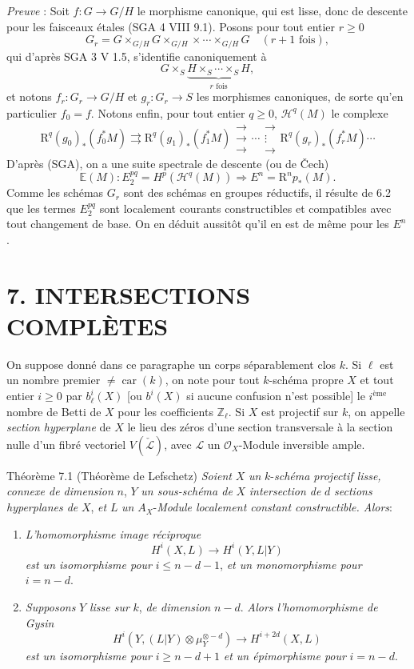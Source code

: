 \emph{Preuve} : Soit $f:G\to G/H$ le morphisme canonique, qui est lisse, donc de descente pour les faisceaux étales (SGA 4 VIII 9.1). Posons pour tout entier $r\ge0$
\[
G_r=G\times_{G/H}G\times_{G/H}\times\cdots\times_{G/H}G
\quad(r+1\text{ fois}),
\]
qui d'après SGA 3 V 1.5, s'identifie canoniquement à
\[
G\times_S\underbrace{H\times_S\cdots\times_S H}_{r\text{ fois}},
\]
et notons $f_r:G_r\to G/H$ et $g_r:G_r\to S$ les morphismes canoniques, de sorte qu'en particulier $f_0=f$. Notons enfin, pour tout entier $q\ge0$, $\mathcal{H}^q(M)$ le complexe
\[
\mathrm{R}^q(g_0)_*(f_0^*M)\rightrightarrows \mathrm{R}^q(g_1)_*(f_1^*M)\mathrel{\substack{\to\\\to\\\to}}\cdots\mathrel{\substack{\to\\\vdots\\\to}} \mathrm{R}^q(g_r)_*(f_r^*M)\cdots
\]
D'après (SGA), on a une suite spectrale de descente (ou de Čech)
\[
\mathbb{E}(M):E_2^{pq}=H^p(\mathcal{H}^q(M))\Rightarrow E^n=\mathrm{R}^np_*(M).
\]
Comme les schémas $G_r$ sont des schémas en groupes réductifs, il résulte de 6.2 que les termes $E_2^{pq}$ sont localement courants constructibles et compatibles avec tout changement de base. On en déduit aussitôt qu'il en est de même pour les $E^n$.

\section*{7. INTERSECTIONS COMPLÈTES}

On suppose donné dans ce paragraphe un corps séparablement clos $k$. Si $\ell$ est un nombre premier $\ne\operatorname{car}(k)$, on note pour tout $k$-schéma propre $X$ et tout entier $i\ge0$ par
$b_\ell^i(X)$ [ou $b^i(X)$ si aucune confusion n'est possible] le $i^{\text{ème}}$ nombre de Betti de $X$ pour les coefficients $\mathbb{Z}_\ell$. Si $X$ est projectif sur $k$, on appelle \emph{section hyperplane} de $X$ le lieu des zéros d'une section transversale à la section nulle d'un fibré vectoriel $V(\check{\mathcal{L}})$, avec $\mathcal{L}$ un $\mathcal{O}_X$-Module inversible ample.

\begin{statement}{Théorème 7.1}
(Théorème de Lefschetz) \emph{Soient} $X$ \emph{un} $k$-\emph{schéma projectif lisse, connexe de dimension} $n$, $Y$ \emph{un sous-schéma de} $X$ \emph{intersection de} $d$ \emph{sections hyperplanes de} $X$, \emph{et} $L$ \emph{un} $A_X$-\emph{Module localement constant constructible. Alors}:
\begin{enumerate}[label=(\roman*)]
\item \emph{L'homomorphisme image réciproque}
\[
H^i(X,L)\to H^i(Y,L|Y)
\]
\emph{est un isomorphisme pour} $i\le n-d-1$, \emph{et un monomorphisme pour} $i=n-d$.
\item \emph{Supposons} $Y$ \emph{lisse sur} $k$, \emph{de dimension} $n-d$. \emph{Alors l'homomorphisme de Gysin}
\[
H^i(Y,(L|Y)\otimes\mu_Y^{\otimes -d})\to H^{i+2d}(X,L)
\]
\emph{est un isomorphisme pour} $i\ge n-d+1$ \emph{et un épimorphisme pour} $i=n-d$.
\end{enumerate}
\end{statement}

